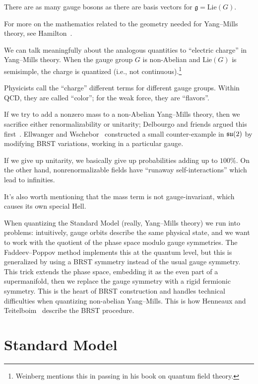 There are as many gauge bosons as there are basis vectors for $\mathfrak{g}=\mathrm{Lie}(G)$.

For more on the mathematics related to the geometry needed for
Yang--Mills theory, see Hamilton~\cite{Hamilton:2017gbn}.

We can talk meaningfully about the analogous quantities to ``electric
charge'' in Yang--Mills theory. When the gauge group $G$ is non-Abelian
and $\mathrm{Lie}(G)$ is semisimple,
the charge is quantized (i.e., not continuous).\footnote{Weinberg
mentions this in passing in his book on quantum field theory.}

Physicists call the ``charge'' different terms for different gauge
groups. Within QCD, they are called ``color''; for the weak force, they
are ``flavors''.

If we try to add a nonzero mass to a non-Abelian Yang--Mills theory,
then we sacrifice either renormalizability or unitarity; Delbourgo and
friends argued this first~\cite{Delbourgo:1987np}.
Ellwanger and Wschebor~\cite{Ellwanger:2002sj} constructed a small
counter-example in $\mathfrak{su}(2)$ by modifying BRST variations, working in a
particular gauge.

If we give up unitarity, we basically give up probabilities adding up to
$100\%$. On the other hand, nonrenormalizable fields have ``runaway
self-interactions'' which lead to infinities.

It's also worth mentioning that the mass term is not gauge-invariant,
which causes its own special Hell.

When quantizing the Standard Model (really, Yang--Mills theory) we run
into problems: intuitively, gauge orbits describe the same physical
state, and we want to work with the quotient of the phase space modulo
gauge symmetries. The Faddeev--Poppov method implements this at the
quantum level, but this is generalized by using a BRST symmetry instead
of the usual gauge symmetry. This trick extends the phase space, embedding it as
the even part of a supermanifold, then we replace the gauge symmetry
with a rigid fermionic symmetry. This is the heart of BRST construction
and handles technical difficulties when quantizing non-abelian Yang--Mills.
This is how Henneaux and Teitelboim~\cite[\S8.1]{Henneaux:1992ig}
describe the BRST procedure.

\section{Standard Model}

